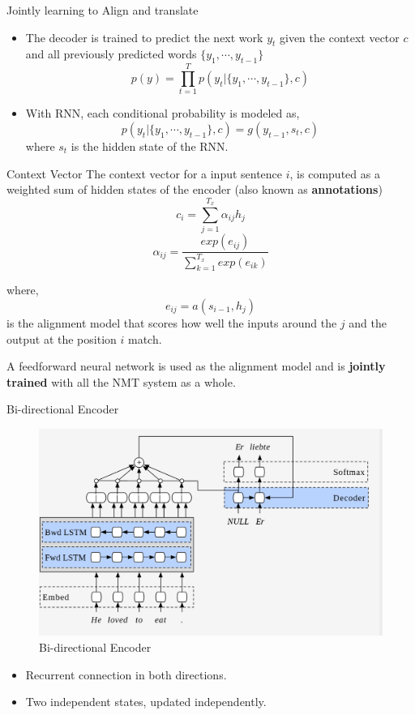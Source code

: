 ﻿\documentclass[aspectratio=43,mathserif,xcolor={usenames,dvipsnames,svgnames,table},10pt]{beamer}
\begin{document}
\begin{frame}{Jointly learning to Align and translate}
\begin{itemize}
 \item The decoder is trained to predict the next work $y_t$ given the context vector $c$ and all previously predicted words $\{ y_1, \cdots, y_{t-1}\}$
 $$ p(y) = \prod^{T}_{t=1} p(y_t | \{ y_1, \cdots, y_{t-1}\} ,c ) $$
 \item With RNN, each conditional probability is modeled as,
 $$ p(y_t | \{ y_1, \cdots, y_{t-1}\}, c) = g(y_{t-1}, s_t, c) $$ where $s_t$ is the hidden state of the RNN.
 \end{itemize}

\end{frame}


\begin{frame}{Context Vector}
  The context vector for a input sentence $i$, is computed as a weighted sum of hidden states of the encoder (also known as \textbf{annotations})
  $$ c_i = \sum_{j=1}^{T_{x}} \alpha_{ij} h_j$$
  $$ \alpha_{ij} = \frac{ exp(e_{ij})}{ \sum_{k=1}^{T_x} exp (e_{ik})}$$

where,
$$ e_{ij} = a(s_{i-1}, h_j)  $$ is the alignment model that scores how well the inputs around the $j$ and the output at the position $i$ match.

A feedforward neural network is used as the alignment model and is \textbf{jointly trained} with all the NMT system as a whole.
\end{frame}

\begin{frame}{Bi-directional Encoder}
 
 \begin{figure}[h]
    \includegraphics[width=0.9\linewidth]{images/birnn.png}  
    \caption{Bi-directional Encoder}
  \end{figure}
  \begin{itemize}
   \item Recurrent connection in both directions.
   \item Two independent states, updated independently.
  \end{itemize}
\end{frame}
\end{document}
